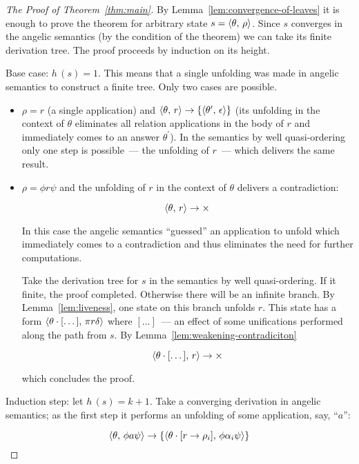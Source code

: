 \begin{proof}[The Proof of Theorem~\ref{thm:main}]
  By Lemma~\ref{lem:convergence-of-leaves} it is enough to prove the theorem for arbitrary state $s=\langle \theta,\,\rho \rangle$. Since $s$
  converges in the angelic semantics (by the condition of the theorem) we can take its finite derivation tree. The proof proceeds by induction
  on its height.

  Base case: $h\,(s)=1$. This means that a single unfolding was made in angelic semantics to construct a finite tree. Only two cases
  are possible.

  \begin{itemize}
  \item $\rho=r$ (a single application) and $\langle \theta,\,r \rangle\to\{\langle \theta^\prime,\,\epsilon \rangle\}$ (its unfolding in the context of $\theta$
    eliminates all relation applications in the body of $r$ and immediately comes to an answer $\theta^\prime$). In the semantics by well quasi-ordering
    only one step is possible~--- the unfolding of $r$~--- which delivers the same result.
    
  \item $\rho=\phi r \psi$ and the unfolding of $r$ in the context of $\theta$ delivers a contradiction:

    \[
    \langle \theta,\,r \rangle\to\times
    \]

    In this case the angelic semantics ``guessed'' an application to unfold which immediately comes to a contradiction and thus eliminates the
    need for further computations.

    Take the derivation tree for $s$ in the semantics by well quasi-ordering. If it finite, the proof completed. Otherwise there will be an infinite branch. By
    Lemma~\ref{lem:liveness}, one state on this branch unfolds $r$. This state has a form $\langle \theta\cdot[\dots],\,\pi r \delta \rangle$ where
    $[\dots]$~--- an effect of some unifications performed along the path from $s$. By Lemma~\ref{lem:weakening-contradiciton}
    
    \[
    \langle \theta\cdot[\dots],\,r \rangle\to\times
    \]

    which concludes the proof.
    
  \end{itemize}

  Induction step: let $h\,(s)=k+1$. Take a converging derivation in angelic semantics; as the first step it performs an unfolding of
  some application, say, ``$a$'':

  \[
  \langle \theta,\,\phi a \psi \rangle \to \{\langle \theta\cdot[r\to\rho_i],\,\phi\alpha_i\psi \rangle\}
  \]


\end{proof}
